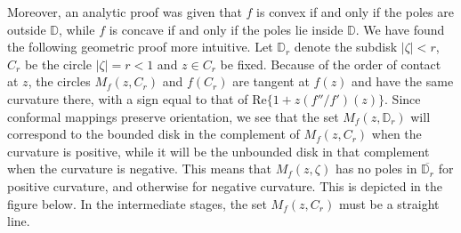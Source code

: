\documentclass[reqno]{amsart}
\theoremstyle{plain}
\theoremstyle{definition}
\newcommand{\D}{\mathbb{D}}
\begin{document}
Moreover, an analytic proof was given that $f$ is convex if and only if the poles are outside $\D$, while $f$ is concave if and only if the poles lie inside $\D$. We have found the following geometric proof more intuitive. Let $\D_r$ denote the subdisk $|\zeta|<r$,  $C_r$ be the circle $|\zeta|=r<1$ and $z\in C_r$ be fixed. Because of the order of contact at $z$, the circles $M_f(z, C_r)$ and $f(C_r)$ are tangent at $f(z)$ and have the same curvature there, with a sign equal to that of \textup{Re}$\{1 + z(f''/f')(z)\}$. Since conformal mappings preserve orientation, we see that the set $M_f(z, \D_r)$ will correspond to the bounded disk in the complement of $M_f(z, C_r)$ when the curvature is positive, while it will be the unbounded disk in that complement when the curvature is negative. This means that $M_f(z,\zeta)$ has no poles
in $\overline{\D_r}$ for positive curvature, and otherwise for negative curvature. This is depicted in the figure below. In the intermediate stages, the set $M_f(z, C_r)$ must be a straight line. 
\end{document}
